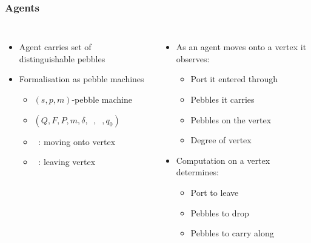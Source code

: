 \documentclass{beamer}
\DeclareMathOperator{\din}{\delta_{\mathit{in}}}
\DeclareMathOperator{\dout}{\delta_{\mathit{out}}}
\begin{document}
\begin{frame}
  \frametitle{Agents}
  \begin{columns}
    \begin{itemize}
      \item Agent carries set of distinguishable pebbles
      \item Formalisation as pebble machines
        \begin{itemize}
          \item $(s,p,m)$-pebble machine
          \item $(Q,F,P,m,\delta,\din,\dout,q_{0})$
          \item<2-> $\din$: moving onto vertex
          \item<8-> $\dout$: leaving vertex
        \end{itemize}
    \end{itemize}
    \begin{itemize}
      \item<3-> As an agent moves onto a vertex it observes:
        \begin{itemize}
          \item<4-> Port it entered through
          \item<5-> Pebbles it carries
          \item<6-> Pebbles on the vertex
          \item<7-> Degree of vertex
        \end{itemize}
      \item<9-> Computation on a vertex determines:
        \begin{itemize}
          \item<10-> Port to leave
          \item<11-> Pebbles to drop
          \item<12-> Pebbles to carry along
        \end{itemize}
    \end{itemize}
  \end{columns}
\end{frame}
\end{document}
